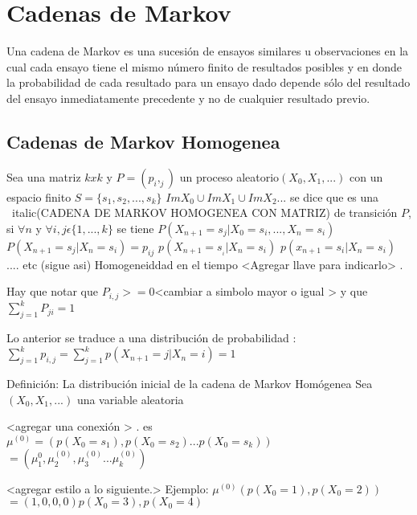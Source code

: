 \chapter{Cadenas de Markov}



Una cadena de Markov es una sucesi\'on de ensayos similares u observaciones en la cual cada ensayo tiene el mismo n\'umero finito de resultados posibles y en donde la probabilidad de cada resultado para un ensayo dado depende s\'olo del resultado del ensayo inmediatamente precedente y no de cualquier resultado previo.


\section{Cadenas de Markov Homogenea}

Sea una matriz $k x k$ y $P = (p_i,_j)$ un proceso aleatorio$(X_0,X_1,...)$ con un espacio finito $S = \{s_1,s_2,...,s_k\}$ $ Im X_0 \cup Im X_1 \cup ImX_2$... se dice que es una ~italic(CADENA DE MARKOV HOMOGENEA CON MATRIZ) de transici\'on $P$, si $\forall n$ y $\forall i,j \epsilon \{1,...,k\} $ se tiene $P(X_{n +1} = s_j | X_0 = s_i,..., X_n = s_i)$\\


$ P (X_{n+1} = s_j | X_n = s_i) = p_{ij}$
$p(X_{n + 1} = s_{_i} |X_n = s_i )$
$p(x_{n+1} = s_i | X _n = s_i) $
.... etc (sigue asi)
Homogeneiddad en el tiempo
<Agregar llave  para indicarlo>
.

Hay que notar que $P_{i,j} >= 0$<cambiar a simbolo mayor o igual > y que $\sum_{j=1}^{k}P_{ji} = 1$

Lo anterior se traduce a una  distribuci\'on de probabilidad :
$\sum_{j = 1}^{k}p_{i,j} = \sum_{j = 1}^k p(X_{n +1} = j | X_n = i) = 1$

 Definici\'on: La distribuci\'on inicial  de la cadena de Markov Hom\'ogenea
Sea  $(X_0,X_1,...) $ una variable aleatoria

<agregar una conexi\'on >
.
es
$\mu^{(0)} = (p(X_0 = s_1), p(X_0 = s_2) ...p(X_0 = s_k))$
$ = ( \mu_1^0, \mu_2^{(0)},\mu_3^{(0)} ... \mu_k^{(0)})  $

<agregar estilo a lo siguiente.>
Ejemplo: $\mu^{(0)} (p(X_0 = 1), p(X_0 = 2)) $
$= (1, 0, 0, 0)p(X_0 = 3), p(X_0 = 4)$

